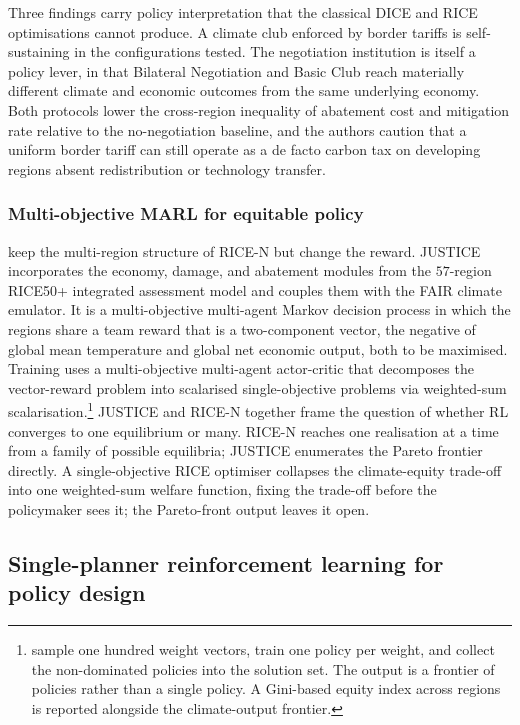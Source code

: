 Three findings carry policy interpretation that the classical DICE
and RICE optimisations cannot produce. A climate club enforced by
border tariffs is self-sustaining in the configurations tested. The
negotiation institution is itself a policy lever, in that Bilateral
Negotiation and Basic Club reach materially different climate and
economic outcomes from the same underlying economy. Both protocols
lower the cross-region inequality of abatement cost and mitigation
rate relative to the no-negotiation baseline, and the authors
caution that a uniform border tariff can still operate as a de
facto carbon tax on developing regions absent redistribution or
technology transfer.

\subsubsection{Multi-objective MARL for equitable policy}
\label{sec:macro:justice}

\citet{Biswas2025justice} keep the multi-region structure of RICE-N
but change the reward. JUSTICE incorporates the economy, damage, and
abatement modules from the $57$-region RICE50+ integrated assessment
model and couples them with the FAIR climate emulator. It is a
multi-objective multi-agent Markov decision process in which the
regions share a team reward that is a two-component vector, the
negative of global mean temperature and global net economic output,
both to be maximised.
Training uses a multi-objective multi-agent actor-critic that
decomposes the vector-reward problem into scalarised single-objective
problems via weighted-sum scalarisation.\footnote{\citet{Biswas2025justice}
sample one hundred weight vectors, train one policy per weight, and
collect the non-dominated policies into the solution set. The output
is a frontier of policies rather than a single policy. A Gini-based
equity index across regions is reported alongside the climate-output
frontier.} JUSTICE and RICE-N together frame the question of whether
RL converges to one equilibrium or many. RICE-N reaches one
realisation at a time from a family of possible equilibria; JUSTICE
enumerates the Pareto frontier directly. A single-objective RICE
optimiser collapses the climate-equity trade-off into one
weighted-sum welfare function, fixing the trade-off before the
policymaker sees it; the Pareto-front output leaves it open.

\subsection{Single-planner reinforcement learning for policy design}
\label{sec:macro:policy_single}

